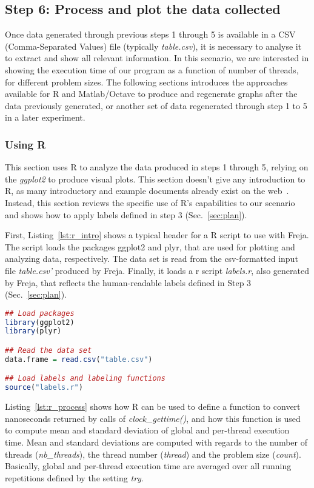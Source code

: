 \subsection{Step 6: Process and plot the data collected}
\label{sec:format}
Once data generated through previous steps 1 through 5 is available in a CSV (Comma-Separated Values) file (typically \emph{table.csv}), it is necessary to analyse it to extract and show all relevant information. In this scenario, we are interested in showing the execution time of our program as a function of number of threads, for different problem sizes. The following sections introduces the approaches available for R and Matlab/Octave to produce and regenerate graphs after the data previously generated, or another set of data regenerated through step 1 to 5 in a later experiment.

\subsubsection{Using R}
This section uses R to analyze the data produced in steps 1 through 5, relying on the \emph{ggplot2} to produce visual plots. This section doesn't give any introduction to R, as many introductory and example documents already exist on the web~\cite{r,rdebuts,ggplot2,ggplot2_examples}. Instead, this section reviews the specific use of R's capabilities to our scenario and shows how to apply labels defined in step 3 (Sec.~\ref{sec:plan}).

First, Listing~\ref{lst:r_intro} shows a typical header for a R script to use with Freja. The script loads the packages ggplot2 and plyr, that are used for plotting and analyzing data, respectively. The data set is read from the csv-formatted input file \emph{table.csv'} produced by Freja. Finally, it loads a r script \emph{labels.r}, also generated by Freja, that reflects the human-readable labels defined in Step 3 (Sec.~\ref{sec:plan}).
\begin{lstlisting}[caption={Introductory section of a R script to plot data produced by Freja.},label={lst:r_intro},language=r]
## Load packages
library(ggplot2)
library(plyr)

## Read the data set
data.frame = read.csv("table.csv")

## Load labels and labeling functions
source("labels.r")
\end{lstlisting}

Listing~\ref{lst:r_process} shows how R can be used to define a function to convert nanoseconds returned by calls of \emph{clock\_gettime()}, and how this function is used to compute mean and standard deviation of global and per-thread execution time. Mean and standard deviations are computed with regards to the number of threads (\emph{nb\_threads}), the thread number (\emph{thread}) and the problem size (\emph{count}). Basically, global and per-thread execution time are averaged over all running repetitions defined by the setting \emph{try}.

